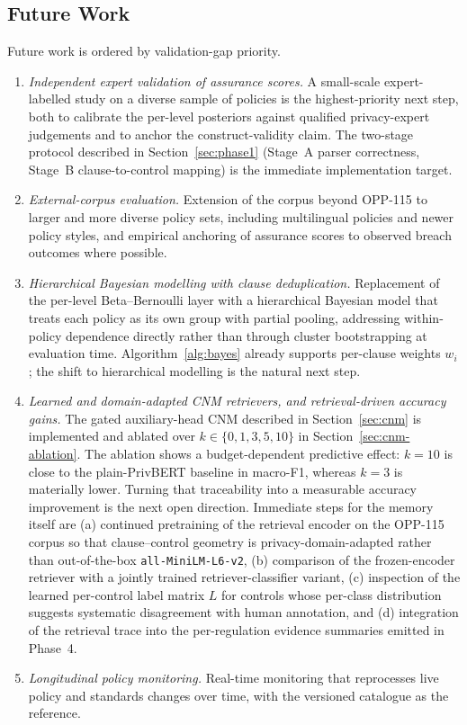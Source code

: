 \documentclass[final,3p,times,twocolumn]{elsarticle}
\begin{document}
	\subsection{Future Work}
	\label{sec:future} Future work is ordered by validation-gap priority. 
	\begin{enumerate}
		\item \emph{Independent expert validation of assurance scores.} A small-scale
			expert-labelled study on a diverse sample of policies is the highest-priority
			next step, both to calibrate the per-level posteriors against qualified privacy-expert
			judgements and to anchor the construct-validity claim. The two-stage
			protocol described in Section~\ref{sec:phase1} (Stage~A parser correctness,
			Stage~B clause-to-control mapping) is the immediate implementation target.

		\item \emph{External-corpus evaluation.} Extension of the corpus beyond OPP-115
			to larger and more diverse policy sets, including multilingual policies and
			newer policy styles, and empirical anchoring of assurance scores to
			observed breach outcomes where possible.

		\item \emph{Hierarchical Bayesian modelling with clause deduplication.}
			Replacement of the per-level Beta--Bernoulli layer with a hierarchical Bayesian
			model that treats each policy as its own group with partial pooling,
			addressing within-policy dependence directly rather than through cluster
			bootstrapping at evaluation time. Algorithm~\ref{alg:bayes} already supports
			per-clause weights $w_{i}$; the shift to hierarchical modelling is the
			natural next step.

		\item \emph{Learned and domain-adapted CNM retrievers, and retrieval-driven accuracy
			gains.} The gated auxiliary-head CNM described in Section~\ref{sec:cnm} is
			implemented and ablated over $k \in \{0, 1, 3, 5, 10\}$ in Section~\ref{sec:cnm-ablation}.
			The ablation shows a budget-dependent predictive effect: $k=10$ is close to
		the plain-PrivBERT baseline in macro-F1, whereas $k=3$ is materially lower.
			Turning that
			traceability into a measurable accuracy improvement is the next open
			direction. Immediate steps for the memory itself are (a) continued pretraining
			of the retrieval encoder on the OPP-115 corpus so that clause--control
			geometry is privacy-domain-adapted rather than out-of-the-box \texttt{all-MiniLM-L6-v2},
			(b) comparison of the frozen-encoder retriever with a jointly trained
			retriever-classifier variant, (c) inspection of the learned per-control label
			matrix $L$ for controls whose per-class distribution suggests systematic disagreement
			with human annotation, and (d) integration of the retrieval trace into the
			per-regulation evidence summaries emitted in Phase~4.

		\item \emph{Longitudinal policy monitoring.} Real-time monitoring that
			reprocesses live policy and standards changes over time, with the versioned
			catalogue as the reference.
	\end{enumerate}
\end{document}
